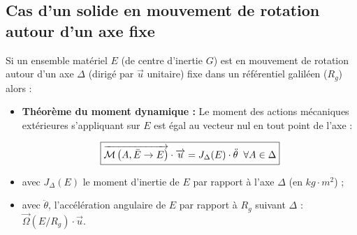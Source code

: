 \documentclass[10pt,fleqn]{article} %
\begin{document}
\subsection{Cas d'un solide en mouvement de rotation autour d'un axe fixe}


\begin{definition}
Si un ensemble matériel $E$ (de centre d'inertie $G$) est en mouvement de rotation autour d'un axe $\Delta$ (dirigé par $\overrightarrow{u}$ unitaire) fixe dans un référentiel galiléen ($R_g$) alors : 

\begin{itemize}
\item \textbf{Théorème du moment dynamique : } Le moment des actions mécaniques extérieures s'appliquant sur $E$ est égal au vecteur nul en tout point de l'axe :

\begin{align}
\boxed{
\overrightarrow{\mathcal{M}\left( {A}, {\bar E} \rightarrow {E}\right)}\cdot \overrightarrow{u}=J_{\Delta}(E)\cdot \ddot{\theta}\;\;\forall A\in \Delta
}
\end{align}
\item avec $J_{\Delta}(E)$ le moment d'inertie de $E$ par rapport à l'axe $\Delta$ (en $kg\cdot m^2$) ;
\item avec $\ddot{\theta}$, l'accélération angulaire de $E$ par rapport à $R_g$ suivant $\Delta$ : $\overrightarrow{\Omega}(E/R_g)\cdot \overrightarrow{u}$.
\end{itemize}
\end{definition}
\end{document}
